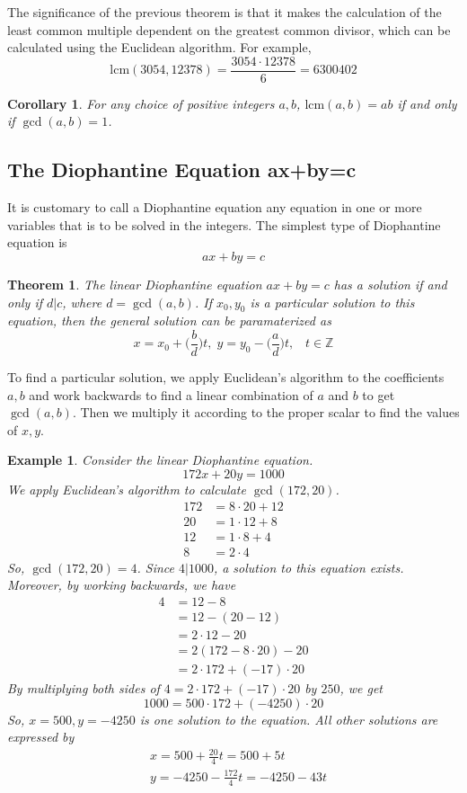\documentclass{article}
\newtheorem{theorem}{Theorem}[section]
\newtheorem{example}{Example}[section]
\newtheorem{corollary}{Corollary}[theorem]
\theoremstyle{remark}
\theoremstyle{definition}
\begin{document}
The significance of the previous theorem is that it makes the calculation of the least common multiple dependent on the greatest common divisor, which can be calculated using the Euclidean algorithm. For example, 
\[\text{lcm}(3054, 12378) = \frac{3054 \cdot 12378}{6} = 6300402\]

\begin{corollary}
For any choice of positive integers $a, b$, $\text{lcm}(a, b) = ab$ if and only if $\gcd(a, b) = 1$. 
\end{corollary}

\subsection{The Diophantine Equation ax+by=c}
It is customary to call a Diophantine equation any equation in one or more variables that is to be solved in the integers. The simplest type of Diophantine equation is
\[a x+ by = c\]

\begin{theorem}
The linear Diophantine equation $ax + by = c$ has a solution if and only if $d|c$, where $d = \gcd(a, b)$. If $x_0, y_0$ is a particular solution to this equation, then the general solution can be paramaterized as
\[x = x_0 + \Big(\frac{b}{d} \Big) t, \; y = y_0 - \Big( \frac{a}{d} \Big) t, \;\;\; t \in \mathbb{Z}\]
\end{theorem}

To find a particular solution, we apply Euclidean's algorithm to the coefficients $a, b$ and work backwards to find a linear combination of $a$ and $b$ to get $\gcd(a, b)$. Then we multiply it according to the proper scalar to find the values of $x, y$. 

\begin{example}
Consider the linear Diophantine equation. 
\[172x + 20y = 1000\]
We apply Euclidean's algorithm to calculate $\gcd(172, 20)$. 
\begin{align*}
    172 & = 8 \cdot 20 + 12 \\
    20 & = 1 \cdot 12 + 8 \\
    12 & = 1 \cdot 8 + 4 \\
    8 & = 2 \cdot 4
\end{align*}
So, $\gcd(172, 20) = 4$. Since $4|1000$, a solution to this equation exists. Moreover, by working backwards, we have
\begin{align*}
    4 &  = 12 - 8 \\
    & = 12 - (20 - 12) \\
    & = 2 \cdot 12 - 20 \\
    & = 2 (172 - 8 \cdot 20) - 20 \\
    & = 2 \cdot 172 + (-17) \cdot 20
\end{align*}
By multiplying both sides of $4 = 2 \cdot 172 + (-17) \cdot 20$ by $250$, we get 
\[1000 = 500 \cdot 172 + (-4250) \cdot 20\]
So, $x = 500, y = -4250$ is one solution to the equation. All other solutions are expressed by 
\begin{align*}
    &x = 500 + \frac{20}{4} t = 500 + 5t \\
    &y = -4250 - \frac{172}{4} t = -4250 - 43t
\end{align*}
\end{example}
\end{document}
